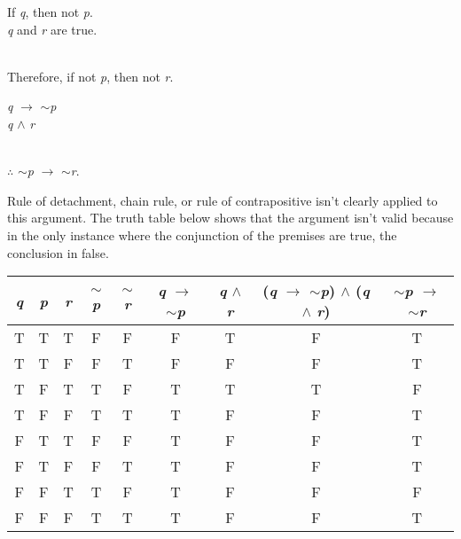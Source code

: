 \documentclass{article}
\begin{document}
\begin{itemize}
    If \emph{q}, then not \emph{p}.\\
    \emph{q} and \emph{r} are true.\\
    \\
    Therefore, if not \emph{p}, then not \emph{r}.
    
    \emph{q} $\to$ $\sim$\emph{p}\\
    \emph{q} $\wedge$ \emph{r}\\
    \\
    $\therefore$ $\sim$\emph{p} $\to$ $\sim$\emph{r}.
    
    {\color{blue} Rule of detachment, chain rule, or rule of contrapositive isn't clearly applied to this argument.  The truth table below shows that the argument isn't valid because in the only instance where the conjunction of the premises are true, the conclusion in false.}
    
    \begin{centering}
        \begin{tabular}{|c|c|c|c|c|c|c|c|c|}
            \hline
            \emph{q} & \emph{p} & \emph{r} & $\sim$\emph{p} & $\sim$\emph{r} & \emph{q} $\to$ $\sim$\emph{p} & \emph{q} $\wedge$ \emph{r} & (\emph{q} $\to$ $\sim$\emph{p}) $\wedge$ (\emph{q} $\wedge$ \emph{r}) & $\sim$\emph{p} $\to$ $\sim$\emph{r} \\
            \hline
            T & T & T & F & F & F & T & F & T \\
            \hline
            T & T & F & F & T & F & F & F & T \\
            \hline
            \rowcolor{LightRed}
            T & F & T & T & F & T & T & T & F \\
            \hline
            T & F & F & T & T & T & F & F & T \\
             \hline
            F & T & T & F & F & T & F & F & T\\
            \hline
            F & T & F & F & T & T & F & F & T\\
            \hline
            F & F & T & T & F & T & F & F & F\\
            \hline
            F & F & F & T & T & T & F & F & T\\
             \hline
        \end{tabular}
    \end{centering}
    

\end{itemize}
\end{document}
